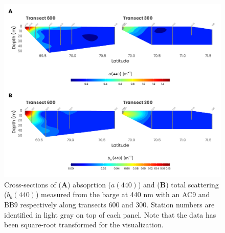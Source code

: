 \documentclass[essd, manuscript]{copernicus}
\begin{document}
\clearpage

\begin{figure}[H]
    \centering
    \includegraphics[scale = 0.85]{../../../graphs/fig05.pdf}
    \caption{Cross-sections of (\textbf{A}) absoprtion ($a(440)$) and (\textbf{B}) total scattering ($b_b(440)$) measured from the barge at 440 nm with an AC9 and BB9 respectively along transects 600 and 300. Station numbers are identified in light gray on top of each panel. Note that the data has been square-root transformed for the visualization.}
\end{figure}

\clearpage
\end{document}
